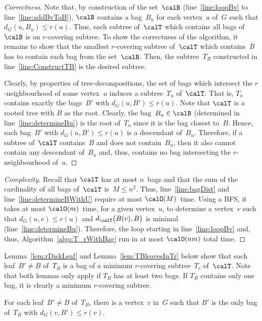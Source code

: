 \begin{proof}
    [Correctness]
Note that, by construction of the set~$\calB$ (line~\ref{line:loopBv} to line~\ref{line:addBvToB}), $\calB$ contains a bag~$B_u$ for each vertex~$u$ of~$G$ such that $d_G(u, B_u) \leq r(u)$.
Thus, each subtree of~$\calT$ which contains all bags of~$\calB$ is an $r$-covering subtree.
To show the correctness of the algorithm, it remains to show that the smallest $r$-covering subtree of~$\calT$ which contains~$B$ has to contain each bag from the set~$\calB$.
Then, the subtree~$T_B$ constructed in line~\ref{line:ConstructTB} is the desired subtree.

Clearly, by properties of tree-decompositions, the set of bags which intersect the $r$-neighbourhood of some vertex~$u$ induces a subtree~$T_u$ of~$\calT$.
That is, $T_u$ contains exactly the bags~$B'$ with $d_G(u, B') \leq r(u)$.
Note that $\calT$ is a rooted tree with $B$ as the root.
Clearly, the bag~$B_u \in \calB$ (determined in line~\ref{line:determineBu}) is the root of~$T_u$ since it is the bag closest to~$B$.
Hence, each bag~$B'$ with $d_G(u, B') \leq r(u)$ is a descendant of~$B_u$.
Therefore, if a subtree of~$\calT$ contains~$B$ and does not contain~$B_u$, then it also cannot contain any descendant of~$B_u$ and, thus, contains no bag intersecting the $r$-neighbourhood of~$u$.
\end{proof}

\begin{proof}
    [Complexity]
Recall that $\calT$ has at most $n$~bags and that the sum of the cardinality of all bags of~$\calT$ is~$M \leq n^2$.
Thus, line~\ref{line:bagDist} and line~\ref{line:determineBWithU} require at most $\calO(M)$~time.
Using a BFS, it takes at most $\calO(m)$~time, for a given vertex~$u$, to determine a vertex~$v$ such that $d_G(u, v) \leq r(u)$ and $d_\calT \big( B(v), B \big)$ is minimal (line~\ref{line:determineBu}).
Therefore, the loop starting in line~\ref{line:loopBv} and, thus, Algorithm~\ref{algo:T_rWithBag} run in at most $\calO(nm)$ total time.
\end{proof}

Lemma~\ref{lem:rDiskLeaf} and Lemma~\ref{lem:TBleavesInTr} below show that each leaf~$B' \neq B$ of~$T_B$ is a bag of a minimum $r$-covering subtree~$T_r$ of~$\calT$.
Note that both lemmas only apply if $T_B$ has at least two bags.
If $T_B$ contains only one bag, it is clearly a minimum $r$-covering subtree.

\begin{lemma}
    \label{lem:rDiskLeaf}
For each leaf~\( B' \neq B \) of~\( T_B \), there is a vertex~\( v \) in~\( G \) such that \( B' \) is the only bag of~\( T_B \) with \( d_G(v, B') \leq r(v) \).
\end{lemma}

